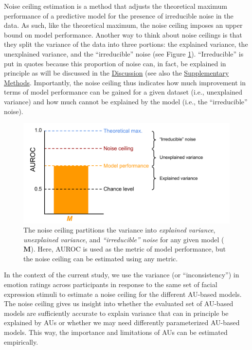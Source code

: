 \documentclass[12pt,american,a4paper,oneside,]{memoir} %
\begin{document}
Noise ceiling estimation is a method that adjusts the theoretical maximum performance of a predictive model for the presence of irreducible noise in the data. As such, like the theoretical maximum, the noise ceiling imposes an upper bound on model performance. Another way to think about noise ceilings is that they split the variance of the data into three portions: the explained variance, the unexplained variance, and the ``irreducible'' noise (see Figure \ref{fig:fig-hka-3}). ``Irreducible'' is put in quotes because this proportion of noise can, in fact, be explained in principle as will be discussed in the \protect\hyperlink{kha-discussion}{Discussion} (see also the \protect\hyperlink{hypothesis-kernel-analysis-supplement}{Supplementary Methods}. Importantly, the noise ceiling thus indicates how much improvement in terms of model performance can be gained for a given dataset (i.e., unexplained variance) and how much cannot be explained by the model (i.e., the ``irreducible'' noise).

\begin{figure}
\centering
\includegraphics{_bookdown_files/hypothesis-kernel-analysis-files/figures/figure_3.pdf}
\caption{\label{fig:fig-hka-3}The noise ceiling partitions the variance into \emph{explained variance}, \emph{unexplained variance}, and \emph{``irreducible'' noise} for any given model (\(\mathbf{M}\)). Here, AUROC is used as the metric of model performance, but the noise ceiling can be estimated using any metric.}
\end{figure}



In the context of the current study, we use the variance (or ``inconsistency'') in emotion ratings across participants in response to the same set of facial expression stimuli to estimate a noise ceiling for the different AU-based models. The noise ceiling gives us insight into whether the evaluated set of AU-based models are sufficiently accurate to explain variance that can in principle be explained by AUs or whether we may need differently parameterized AU-based models. This way, the importance and limitations of AUs can be estimated empirically.
\end{document}
